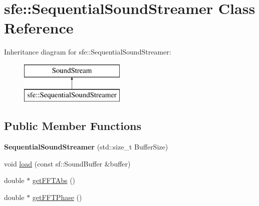 \hypertarget{classsfe_1_1_sequential_sound_streamer}{\section{sfe\+:\+:Sequential\+Sound\+Streamer Class Reference}
\label{classsfe_1_1_sequential_sound_streamer}
}
Inheritance diagram for sfe\+:\+:Sequential\+Sound\+Streamer\+:\begin{figure}[H]
\begin{center}
\leavevmode
\includegraphics[height=2.000000cm]{classsfe_1_1_sequential_sound_streamer}
\end{center}
\end{figure}
\subsection*{Public Member Functions}
\begin{DoxyCompactItemize}
\item 
\hypertarget{classsfe_1_1_sequential_sound_streamer_a0889a532e125e6229911c87a4411149b}{{\bfseries Sequential\+Sound\+Streamer} (std\+::size\+\_\+t Buffer\+Size)}\label{classsfe_1_1_sequential_sound_streamer_a0889a532e125e6229911c87a4411149b}

\item 
void \hyperlink{classsfe_1_1_sequential_sound_streamer_a650824533bf27a504739798fc4291e69}{load} (const sf\+::\+Sound\+Buffer \&buffer)
\item 
double $\ast$ \hyperlink{classsfe_1_1_sequential_sound_streamer_a54215b061173c1c6b1bebe73a8e79cf0}{get\+F\+F\+T\+Abs} ()
\item 
double $\ast$ \hyperlink{classsfe_1_1_sequential_sound_streamer_a7c94675b37f7f18ae3b535b1c358fb3b}{get\+F\+F\+T\+Phase} ()
\end{DoxyCompactItemize}


